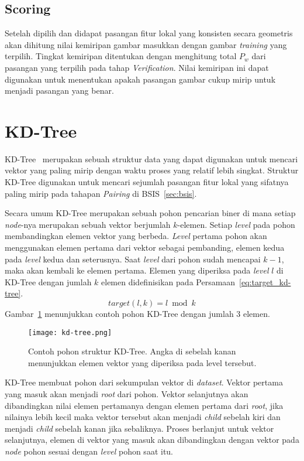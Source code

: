 \subsection{Scoring}
\label{subsec:bsis_scoring}
Setelah dipilih dan didapat pasangan fitur lokal yang konsisten secara geometris akan dihitung nilai kemiripan gambar masukkan dengan gambar \textit{training} yang terpilih. Tingkat kemiripan ditentukan dengan menghitung total $P_w$ dari pasangan yang terpilih pada tahap \textit{Verification}. Nilai kemiripan ini dapat digunakan untuk menentukan apakah pasangan gambar cukup mirip untuk menjadi pasangan yang benar.

\section{KD-Tree}
\label{sec:kdtree}
KD-Tree~\cite{bentley1975multidimensional} merupakan sebuah struktur data yang dapat digunakan untuk mencari vektor yang paling mirip dengan waktu proses yang relatif lebih singkat. Struktur KD-Tree digunakan untuk mencari sejumlah pasangan fitur lokal yang sifatnya paling mirip pada tahapan \textit{Pairing} di BSIS~\ref{sec:bsis}. 

Secara umum KD-Tree merupakan sebuah pohon pencarian biner di mana setiap \textit{node}-nya merupakan sebuah vektor berjumlah $k$-elemen. Setiap \textit{level} pada pohon membandingkan elemen vektor yang berbeda. \textit{Level} pertama pohon akan menggunakan elemen pertama dari vektor sebagai pembanding, elemen kedua pada \textit{level} kedua dan seterusnya. Saat \textit{level} dari pohon sudah mencapai $k - 1$, maka akan kembali ke elemen pertama. Elemen yang diperiksa pada \textit{level} $l$ di KD-Tree dengan jumlah $k$ elemen didefinisikan pada Persamaan~\ref{eq:target_kd-tree}.
\vspace{-4px}
\begin{equation}
	\label{eq:target_kd-tree}
	target(l, k) = l\bmod k
\end{equation}
Gambar~\ref{fig:kd-tree} menunjukkan contoh pohon KD-Tree dengan jumlah 3 elemen.
\begin{figure}[H]
	\centering
	\texttt{[image: kd-tree.png]}
	\caption{Contoh pohon struktur KD-Tree. Angka di sebelah kanan menunjukkan elemen vektor yang diperiksa pada level tersebut.}
	\label{fig:kd-tree}
\end{figure}

KD-Tree membuat pohon dari sekumpulan vektor di \textit{dataset}. Vektor pertama yang masuk akan menjadi \textit{root} dari pohon. Vektor selanjutnya akan dibandingkan nilai elemen pertamanya dengan elemen pertama dari \textit{root}, jika nilainya lebih kecil maka vektor tersebut akan menjadi \textit{child} sebelah kiri dan menjadi \textit{child} sebelah kanan jika sebaliknya. Proses berlanjut untuk vektor selanjutnya, elemen di vektor yang masuk akan dibandingkan dengan vektor pada \textit{node} pohon sesuai dengan \textit{level} pohon saat itu. 

